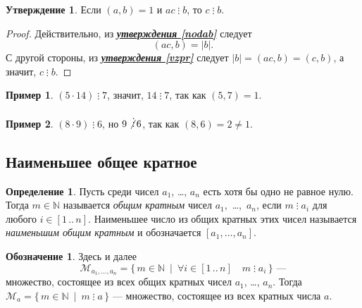 \documentclass[14pt, a4paper]{extarticle}
\theoremstyle{definition}
\newtheorem*{definition}{Определение}
\newtheorem*{desig}{Обозначение}
\newtheorem{example}{Пример}
\newtheorem{statement}{Утверждение}
\newcommand{\divisible}{\mathop{\vdots}}
\begin{document}
	\begin{statement}
	\label{divpr}
		Если $(a,b)=1$ и $ac\divisible b$, то $c\divisible b$.
	\end{statement}
	\begin{proof}
		Действительно, из \hyperref[nodab]{\textbf{\textit{утверждения \ref*{nodab}}}} следует $$(ac,b)=|b|.$$ С другой стороны, из \hyperref[vzpr]{\textbf{\textit{утверждения \ref*{vzpr}}}} следует $|b|=(ac,b)=(c,b)$, а значит, $c\divisible b$.
	\end{proof}

	\begin{example}
		$(5\cdot14)\divisible7$, значит, $14\divisible7$, так как $(5,7)=1$.
	\end{example}
	\begin{example}
		$(8\cdot9)\divisible 6$, но $9\not\divisible6$, так как $(8,6)=2\neq1$.
	\end{example}

\subsection{Наименьшее общее кратное}
\label{nok}
	
	\begin{definition}
		Пусть среди чисел $a_1$, \dots, $a_n$ есть хотя бы одно не равное нулю. Тогда $m\in\mathbb{N}$ называется \emph{общим кратным} чисел \mbox{$a_1$, \dots, $a_n$}, если $m\divisible a_i$ для любого $i\in[1\,..\,n]$. Наименьшее число из общих кратных этих чисел называется \emph{наименьшим общим кратным} и обозначается $[a_1,\dots,a_n]$.
	\end{definition}
	
	\begin{desig}
		Здесь и далее $$\mathcal{M}_{a_1,\dots,a_n}=\{\,m\in\mathbb{N}\:\mid\:\forall i\in[1\,..\,n]\quad m\divisible a_i\,\}\text{ ---}$$ множество, состоящее из всех общих кратных чисел $a_1$, \dots, $a_n$. Тогда $\mathcal{M}_a=\{\,m\in\mathbb{N}\:\mid\:m\divisible a\,\}$ --- множество, состоящее из всех кратных числа $a$.
	\end{desig}
\end{document}
